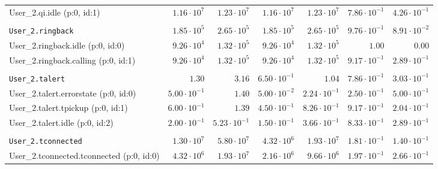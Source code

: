 \begin{table}[htbp]
{\begin{tabular}{lrrrrrr}
\hspace{3mm}User\_2.qi.idle (p:0, id:1)               &  $1.16 \cdot 10^{7}$ &  $1.23 \cdot 10^{7}$ &  $1.16 \cdot 10^{7}$ &  $1.23 \cdot 10^{7}$ & $7.86 \cdot 10^{-1}$ & $4.26 \cdot 10^{-1}$ \\
\\[-8pt]\texttt{User\_2.ringback}                     &  $1.85 \cdot 10^{5}$ &  $2.65 \cdot 10^{5}$ &  $1.85 \cdot 10^{5}$ &  $2.65 \cdot 10^{5}$ & $9.76 \cdot 10^{-1}$ & $8.91 \cdot 10^{-2}$ \\
\hspace{3mm}User\_2.ringback.idle (p:0, id:0)         &  $9.26 \cdot 10^{4}$ &  $1.32 \cdot 10^{5}$ &  $9.26 \cdot 10^{4}$ &  $1.32 \cdot 10^{5}$ &               $1.00$ &               $0.00$ \\
\hspace{3mm}User\_2.ringback.calling (p:0, id:1)      &  $9.26 \cdot 10^{4}$ &  $1.32 \cdot 10^{5}$ &  $9.26 \cdot 10^{4}$ &  $1.32 \cdot 10^{5}$ & $9.17 \cdot 10^{-1}$ & $2.89 \cdot 10^{-1}$ \\
\\[-8pt]\texttt{User\_2.talert}                       &               $1.30$ &               $3.16$ & $6.50 \cdot 10^{-1}$ &               $1.04$ & $7.86 \cdot 10^{-1}$ & $3.03 \cdot 10^{-1}$ \\
\hspace{3mm}User\_2.talert.errorstate (p:0, id:0)     & $5.00 \cdot 10^{-1}$ &               $1.40$ & $5.00 \cdot 10^{-2}$ & $2.24 \cdot 10^{-1}$ & $2.50 \cdot 10^{-1}$ & $5.00 \cdot 10^{-1}$ \\
\hspace{3mm}User\_2.talert.tpickup (p:0, id:1)        & $6.00 \cdot 10^{-1}$ &               $1.39$ & $4.50 \cdot 10^{-1}$ & $8.26 \cdot 10^{-1}$ & $9.17 \cdot 10^{-1}$ & $2.04 \cdot 10^{-1}$ \\
\hspace{3mm}User\_2.talert.idle (p:0, id:2)           & $2.00 \cdot 10^{-1}$ & $5.23 \cdot 10^{-1}$ & $1.50 \cdot 10^{-1}$ & $3.66 \cdot 10^{-1}$ & $8.33 \cdot 10^{-1}$ & $2.89 \cdot 10^{-1}$ \\
\\[-8pt]\texttt{User\_2.tconnected}                   &  $1.30 \cdot 10^{7}$ &  $5.80 \cdot 10^{7}$ &  $4.32 \cdot 10^{6}$ &  $1.93 \cdot 10^{7}$ & $1.81 \cdot 10^{-1}$ & $1.40 \cdot 10^{-1}$ \\
\hspace{3mm}User\_2.tconnected.tconnected (p:0, id:0) &  $4.32 \cdot 10^{6}$ &  $1.93 \cdot 10^{7}$ &  $2.16 \cdot 10^{6}$ &  $9.66 \cdot 10^{6}$ & $1.97 \cdot 10^{-1}$ & $2.66 \cdot 10^{-1}$ \\

\end{tabular}}
\end{table}
